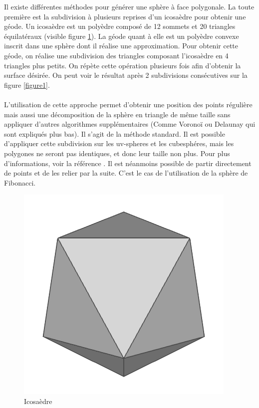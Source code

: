 \documentclass[a4paper]{article}
\begin{document}
Il existe différentes méthodes pour générer une sphère à face polygonale. La toute première est la subdivision à plusieurs reprises d'un  icosaèdre pour obtenir une géode. Un icosaèdre est un polyèdre composé de  12 sommets et 20 triangles équilatéraux (visible figure  \ref{figure0}). La géode quant à elle est un polyèdre convexe inscrit dans une sphère dont il réalise une approximation. Pour obtenir cette géode, on réalise une subdivision des triangles composant l'icosaèdre en  4 triangles plus petits. On répète cette opération plusieurs fois afin d'obtenir la surface désirée. On peut voir le résultat après 2 subdivisions consécutives sur la figure \ref{figure1}.\\
\\
L'utilisation de cette approche permet d'obtenir une position des points régulière mais aussi une décomposition de la sphère en triangle de même taille sans appliquer d'autres algorithmes supplémentaires (Comme Voronoï ou Delaunay qui sont expliqués plus bas). Il s'agit de la méthode standard. Il est possible d'appliquer cette subdivision sur les uv-spheres et les cubesphéres, mais les polygones ne seront pas identiques, et donc leur taille non plus. Pour plus d'informations, voir la référence \cite{SongHoAhn}. Il est néanmoins possible de partir directement de points et de les relier par la suite. C'est le cas de l'utilisation de la sphère de Fibonacci.\\

\begin{figure}[!ht]
    \begin{center}
        \includegraphics[width=0.2\linewidth]{img/sphere/gl_sphere05.png}
        \caption{Icosaèdre\protect\footnotemark}
        \label{figure0}
    \end{center}
\end{figure}

\end{document}
